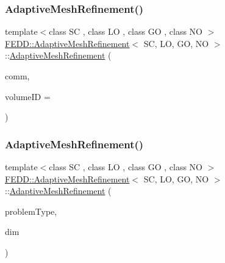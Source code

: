 \mbox{\label{classFEDD_1_1AdaptiveMeshRefinement_a3c39f02b73abebe017642e83a8f5b3bc}} 
\subsubsection{\texorpdfstring{Adaptive\+Mesh\+Refinement()}{AdaptiveMeshRefinement()}\hspace{0.1cm}{\footnotesize\ttfamily [2/4]}}
{\footnotesize\ttfamily template$<$class SC , class LO , class GO , class NO $>$ \\
\hyperlink{classFEDD_1_1AdaptiveMeshRefinement}{F\+E\+D\+D\+::\+Adaptive\+Mesh\+Refinement}$<$ SC, LO, GO, NO $>$\+::\hyperlink{classFEDD_1_1AdaptiveMeshRefinement}{Adaptive\+Mesh\+Refinement} (\begin{DoxyParamCaption}\item[{\hyperlink{classFEDD_1_1AdaptiveMeshRefinement_a6bd5089532bd8dac39bebc4a92e33c40}{Comm\+Const\+Ptr\+\_\+\+Type}}]{comm,  }\item[{int}]{volume\+ID = {} }\end{DoxyParamCaption})}

\mbox{\label{classFEDD_1_1AdaptiveMeshRefinement_a90df20bfec3fa56bb731e39b2008dd8f}} 
\subsubsection{\texorpdfstring{Adaptive\+Mesh\+Refinement()}{AdaptiveMeshRefinement()}\hspace{0.1cm}{\footnotesize\ttfamily [3/4]}}
{\footnotesize\ttfamily template$<$class SC , class LO , class GO , class NO $>$ \\
\hyperlink{classFEDD_1_1AdaptiveMeshRefinement}{F\+E\+D\+D\+::\+Adaptive\+Mesh\+Refinement}$<$ SC, LO, GO, NO $>$\+::\hyperlink{classFEDD_1_1AdaptiveMeshRefinement}{Adaptive\+Mesh\+Refinement} (\begin{DoxyParamCaption}\item[{string}]{problem\+Type,  }\item[{int}]{dim }\end{DoxyParamCaption})}

